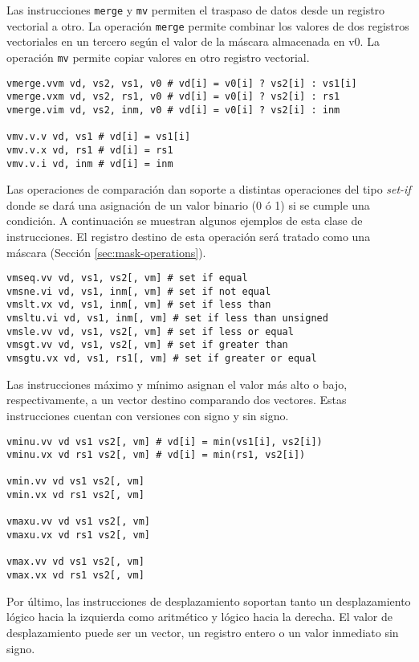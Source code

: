 Las instrucciones \texttt{merge} y \texttt{mv} permiten el traspaso de datos
desde un registro vectorial a otro.  La operación \texttt{merge} permite
combinar los valores de dos registros vectoriales en un tercero según el valor
de la máscara almacenada en v0. La operación \texttt{mv} permite copiar valores
en otro registro vectorial.

\begin{lstlisting}
vmerge.vvm vd, vs2, vs1, v0 # vd[i] = v0[i] ? vs2[i] : vs1[i]
vmerge.vxm vd, vs2, rs1, v0 # vd[i] = v0[i] ? vs2[i] : rs1
vmerge.vim vd, vs2, inm, v0 # vd[i] = v0[i] ? vs2[i] : inm

vmv.v.v vd, vs1 # vd[i] = vs1[i]
vmv.v.x vd, rs1 # vd[i] = rs1
vmv.v.i vd, inm # vd[i] = inm
\end{lstlisting}

Las operaciones de comparación dan soporte a distintas operaciones del tipo
\textit{set-if} donde se dará una asignación de un valor binario (0 ó 1) si se
cumple una condición. A continuación se muestran algunos ejemplos de esta clase
de instrucciones. El registro destino de esta operación será tratado como una
máscara (Sección \ref{sec:mask-operations}).

\begin{lstlisting}
vmseq.vv vd, vs1, vs2[, vm] # set if equal
vmsne.vi vd, vs1, inm[, vm] # set if not equal
vmslt.vx vd, vs1, inm[, vm] # set if less than
vmsltu.vi vd, vs1, inm[, vm] # set if less than unsigned
vmsle.vv vd, vs1, vs2[, vm] # set if less or equal
vmsgt.vv vd, vs1, vs2[, vm] # set if greater than
vmsgtu.vx vd, vs1, rs1[, vm] # set if greater or equal
\end{lstlisting}

Las instrucciones máximo y mínimo asignan el valor más alto o bajo,
respectivamente, a un vector destino comparando dos vectores. Estas
instrucciones cuentan con versiones con signo y sin signo.

\begin{lstlisting}
vminu.vv vd vs1 vs2[, vm] # vd[i] = min(vs1[i], vs2[i])
vminu.vx vd rs1 vs2[, vm] # vd[i] = min(rs1, vs2[i])

vmin.vv vd vs1 vs2[, vm]
vmin.vx vd rs1 vs2[, vm]

vmaxu.vv vd vs1 vs2[, vm]
vmaxu.vx vd rs1 vs2[, vm]

vmax.vv vd vs1 vs2[, vm]
vmax.vx vd rs1 vs2[, vm]
\end{lstlisting}

Por último, las instrucciones de desplazamiento soportan tanto un
desplazamiento lógico hacia la izquierda como aritmético y lógico hacia la
derecha. El valor de desplazamiento puede ser un
vector, un registro entero o un valor inmediato sin signo.

